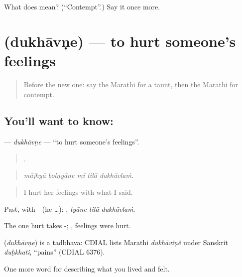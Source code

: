 \begin{tcolorbox}[breakable,colback=teal!4,colframe=teal!35!black,title={Before you move on}]
What does  mean? (\textquotedblleft{}Contempt\textquotedblright{}.) Say it once more.
\end{tcolorbox}
\section[\texorpdfstring{\mr{दुखावणे} (dukhāvṇe)}{दुखावणे (dukhāvṇe)}]{ (dukhāvṇe) — to hurt someone's feelings}

\label{lesson:MR-C461-dukhavne}



\begin{quote}
Before the new one: say the Marathi for a taunt, then the Marathi for contempt.
\end{quote}

\subsection*{You'll want to know: }
\textbf{} — \emph{dukhāvṇe} — \textquotedblleft{}to hurt someone's feelings\textquotedblright{}.

\begin{quote}
    .
\end{quote}

\begin{quote}
\emph{mājhyā bolṇyāne mī tilā dukhāvlaṁ.}
\end{quote}

\begin{quote}
I hurt her feelings with what I said.
\end{quote}

Past, with - (he …):   , \emph{tyāne tilā dukhāvlaṁ}.

The one hurt takes -;  , feelings were hurt.

\begin{cousinweb}
\textbf{} (\emph{dukhāvṇe}) is a tadbhava: CDIAL lists Marathi \emph{dukhāviṇẽ} under Sanskrit \emph{duḥkhati}, \textquotedblleft{}pains\textquotedblright{} (CDIAL 6376).
\end{cousinweb}

\begin{grammarlens}[title={What you've built}]
One more word for describing what you lived and felt.
\end{grammarlens}

